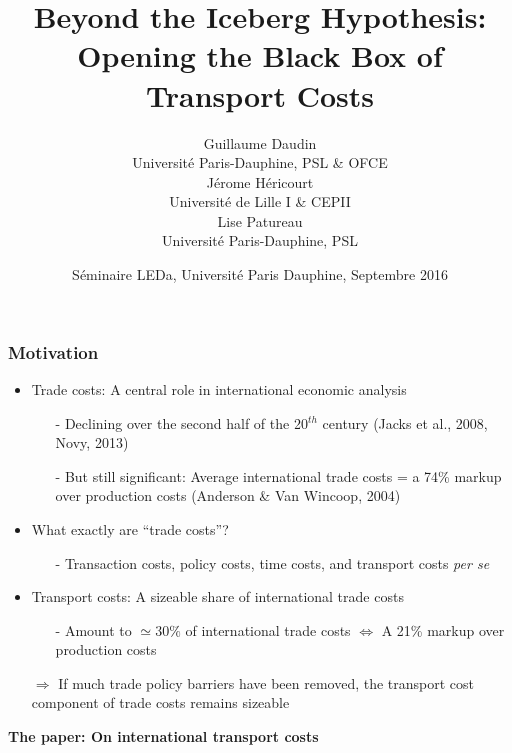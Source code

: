 \documentclass[10 pt,Helvetica, french]{beamer}
\date[September 2016]{S\'{e}minaire LEDa, Universit\'{e} Paris Dauphine, Septembre 2016}
\title[Trade Costs Black Box]{Beyond the Iceberg Hypothesis: \\Opening the Black Box of Transport Costs}
\author[Daudin et al.]{Guillaume Daudin\\
{\footnotesize Universit\'{e} Paris-Dauphine, PSL \& OFCE }\\ \smallskip
J\'{e}rome H\'{e}ricourt \\
{\footnotesize Universit\'{e} de Lille I \& CEPII }\\  \smallskip
Lise Patureau \\
{\footnotesize  Universit\'{e} Paris-Dauphine, PSL}}
\begin{document}
\begin{frame}[plain]
\titlepage
\end{frame}


\begin{frame}
\frametitle{Motivation}
\begin{itemize}
\item Trade costs: A central role in international economic analysis \vspace{0.1cm}
\begin{itemize}
\item[-] Declining over the second half of the 20$^{th}$ century (Jacks et al., 2008, Novy, 2013) \vspace{0.1cm}
\item[-] But still significant: Average international trade costs = a 74\% markup over production costs (Anderson \& Van Wincoop, 2004)
\end{itemize}
\item What exactly are ``trade costs''?  \vspace{0.1cm}
\begin{itemize}
\item[-] Transaction costs, policy costs, time costs, and transport costs \textit{per se}
\end{itemize}
\item Transport costs: A sizeable share of international trade costs \vspace{0.1cm}
\begin{itemize}
\item[-]  Amount to $\simeq 30\%$ of international trade costs  $\Leftrightarrow$ A 21\% markup over production costs  \vspace{0.1cm}
\end{itemize}
\item[$\Rightarrow$] If much trade policy barriers have been removed, the transport cost component of trade costs remains sizeable \vspace{0.1cm}
\end{itemize}
\textbf{The paper: On international transport costs}

\end{frame}
\end{document}
